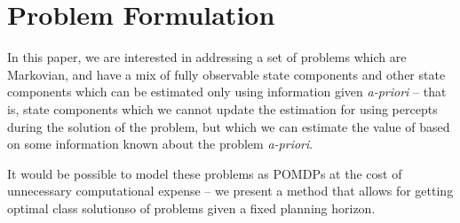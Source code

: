 \documentclass[11pt]{article}
\begin{document}
\section{Problem Formulation}

In this paper, we are interested in addressing a set of problems which
are Markovian, and have a mix of fully observable state components and
other state components which can be estimated only using information
given \emph{a-priori} -- that is, state components which we cannot
update the estimation for using percepts during the solution of the
problem, but which we can estimate the value of based on some
information known about the problem \emph{a-priori}.

It would be possible to model these problems as POMDPs at the cost of
unnecessary computational expense -- we present a method that allows
for getting optimal class solutionso of problems given a fixed
planning horizon.
\end{document}
